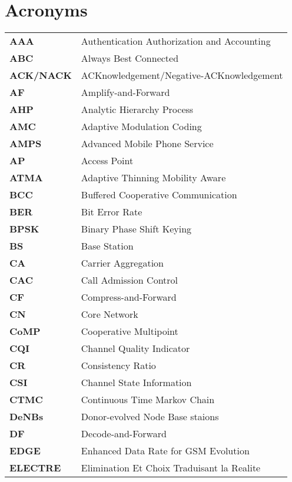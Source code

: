 	
			\chapter*{Acronyms}
			\vspace{-20pt}
\begin{table}[h] \centering
\begin{adjustbox}{max width=\textwidth}
\begin{tabular}{ll}	
\textbf{AAA}&Authentication  Authorization and Accounting\\	
\textbf{ABC}&Always Best Connected  \\	
\textbf{ACK/NACK}&ACKnowledgement/Negative-ACKnowledgement  \\	\textbf{AF}&Amplify-and-Forward  \\			
\textbf{AHP}&Analytic Hierarchy Process \\
\textbf{AMC}&Adaptive Modulation Coding  \\			
\textbf{AMPS}&Advanced Mobile Phone Service \\			
\textbf{AP}&Access Point \\					
\textbf{ATMA}&Adaptive Thinning Mobility Aware \\			
\textbf{BCC}&Buffered Cooperative Communication \\			
\textbf{BER}&Bit Error Rate \\			
\textbf{BPSK}&Binary Phase Shift Keying \\			
\textbf{BS}&Base Station \\			
\textbf{CA}&Carrier Aggregation \\			
\textbf{CAC}&Call Admission Control\\			
\textbf{CF}&Compress-and-Forward \\		
\textbf{CN}&Core Network \\	
\textbf{CoMP}&Cooperative Multipoint \\			
\textbf{CQI}&Channel Quality Indicator \\		
\textbf{CR}&Consistency Ratio \\			
\textbf{CSI}&Channel State Information \\
\textbf{CTMC}&Continuous Time Markov Chain \\	
\textbf{DeNBs}&Donor-evolved Node Base staions \\			
\textbf{DF}&Decode-and-Forward \\			
\textbf{EDGE}& Enhanced Data Rate for GSM Evolution \\			
\textbf{ELECTRE}&Elimination Et Choix Traduisant la Realite \\			

\end{tabular}
\end{adjustbox}
\end{table}
